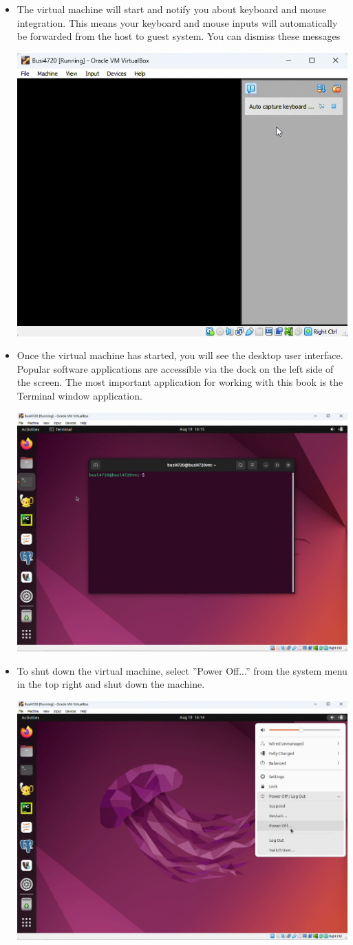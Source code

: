 \begin{enumerate}
\begin{itemize}
\begin{center}
		  \end{center}
      \item The virtual machine will start and notify you about keyboard and mouse integration. This means your keyboard and mouse inputs will automatically be forwarded from the host to guest system. You can dismiss these messages
		  \begin{center}
		  \includegraphics[width=.5\textwidth]{screen24.png}
		  \end{center}
      \item Once the virtual machine has started, you will see the desktop user interface. Popular software applications are accessible via the dock on the left side of the screen. The most important application for working with this book is the Terminal window application.
		  \begin{center}
		  \includegraphics[width=.5\textwidth]{screen26.png}
		  \end{center}
      \item To shut down the virtual machine, select ''Power Off...'' from the system menu in the top right and shut down the machine.
		  \begin{center}
		  \includegraphics[width=.5\textwidth]{screen25.png}
		  \end{center}
  \end{itemize}
\end{enumerate}


